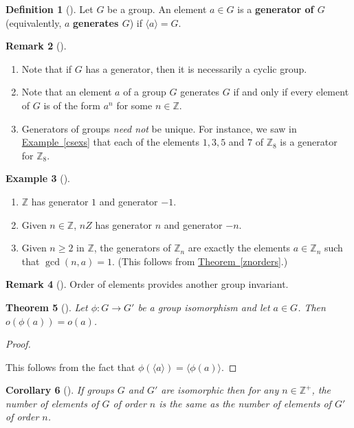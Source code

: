 \documentclass[10pt,]{book}
\newcommand{\terminology}[1]{\textbf{#1}}
\theoremstyle{plain}
\newtheorem{theorem}{Theorem}[section]
\newtheorem{corollary}[theorem]{Corollary}
\theoremstyle{definition}
\newtheorem{definition}[theorem]{Definition}
\theoremstyle{definition}
\newtheorem{remark}[theorem]{Remark}
\theoremstyle{definition}
\newtheorem{example}[theorem]{Example}
\theoremstyle{definition}
\numberwithin{equation}{section}
\def\Z{\mathbb{Z}}
\begin{document}
\begin{definition}[{}]\label{definition-42}
Let \(G\) be a group. An element \(a\in G\) is a \terminology{generator of \(G\)} (equivalently, \(a\) \terminology{generates \(G\)}) if \(\langle a\rangle =G\).%
\end{definition}
\begin{remark}[]\label{remark-23}
\leavevmode%
\begin{enumerate}
\item\hypertarget{li-261}{}Note that if \(G\) has a generator, then it is necessarily a cyclic group.%
\item\hypertarget{li-262}{}Note that an element \(a\) of a group \(G\) generates \(G\) if and only if every element of \(G\) is of the form \(a^n\) for some \(n\in \Z\).%
\item\hypertarget{li-263}{}Generators of groups \emph{need not} be unique.  For instance, we saw in \hyperref[csexs]{Example~\ref{csexs}} that each of the elements \(1,3,5\) and \(7\) of \(\Z_8\) is a generator for \(\Z_8\).%
\end{enumerate}
%
\end{remark}
\begin{example}[]\label{example-45}
\leavevmode%
\begin{enumerate}
\item\hypertarget{li-264}{}\(\Z\) has generator \(1\) and generator \(-1\).%
\item\hypertarget{li-265}{}Given \(n\in \Z\), \(nZ\) has generator \(n\) and generator \(-n\).%
\item\hypertarget{li-266}{}Given \(n\geq 2\) in \(\Z\), the generators of \(\Z_n\) are exactly  the elements \(a\in \Z_n\) such that \(\gcd(n,a)=1\). (This follows from \hyperref[znorders]{Theorem~\ref{znorders}}.)%
\end{enumerate}
%
\end{example}
\begin{remark}[]\label{remark-24}
Order of elements provides another group invariant.%
\end{remark}
\begin{theorem}[{}]\label{ophia}
Let \(\phi:G\to G'\) be a group isomorphism and let \(a\in G\). Then \(o(\phi(a))=o(a)\).%
\end{theorem}
\begin{proof}\hypertarget{proof-30}{}
This follows from the fact that \(\phi(\langle a\rangle )=\langle \phi(a)\rangle\).%
\end{proof}
\begin{corollary}[{}]\label{corollary-4}
If groups \(G\) and \(G'\) are isomorphic then for any \(n\in \Z^+\), the number of elements of \(G\) of order \(n\) is the same as the number of elements of \(G'\) of order \(n\).%
\end{corollary}
\end{document}
